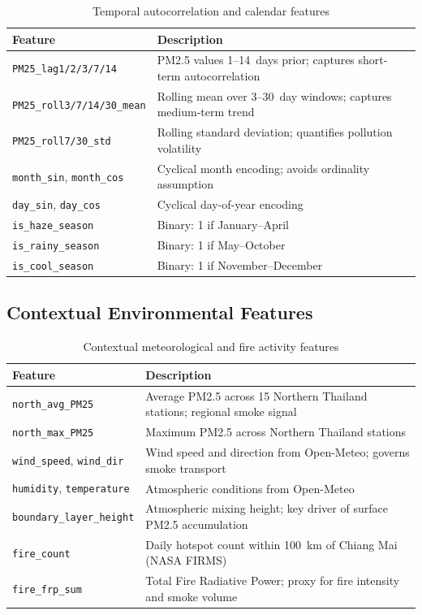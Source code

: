 \documentclass[12pt,a4paper]{report}
\begin{document}
\begin{table}[H]
\centering
\caption{Temporal autocorrelation and calendar features}
\label{tab:temporal_features}
\begin{tabularx}{\textwidth}{@{}lX@{}}
\toprule
\textbf{Feature} & \textbf{Description} \\
\midrule
\texttt{PM25\_lag1/2/3/7/14}       & PM2.5 values 1--14~days prior; captures short-term autocorrelation \\
\texttt{PM25\_roll3/7/14/30\_mean} & Rolling mean over 3--30~day windows; captures medium-term trend \\
\texttt{PM25\_roll7/30\_std}       & Rolling standard deviation; quantifies pollution volatility \\
\texttt{month\_sin}, \texttt{month\_cos} & Cyclical month encoding; avoids ordinality assumption \\
\texttt{day\_sin}, \texttt{day\_cos}     & Cyclical day-of-year encoding \\
\texttt{is\_haze\_season}          & Binary: 1 if January--April \\
\texttt{is\_rainy\_season}         & Binary: 1 if May--October \\
\texttt{is\_cool\_season}          & Binary: 1 if November--December \\
\bottomrule
\end{tabularx}
\end{table}

\subsection{Contextual Environmental Features}

\begin{table}[H]
\centering
\caption{Contextual meteorological and fire activity features}
\label{tab:contextual_features}
\begin{tabularx}{\textwidth}{@{}lX@{}}
\toprule
\textbf{Feature} & \textbf{Description} \\
\midrule
\texttt{north\_avg\_PM25}       & Average PM2.5 across 15 Northern Thailand stations; regional smoke signal \\
\texttt{north\_max\_PM25}       & Maximum PM2.5 across Northern Thailand stations \\
\texttt{wind\_speed}, \texttt{wind\_dir} & Wind speed and direction from Open-Meteo; governs smoke transport \\
\texttt{humidity}, \texttt{temperature} & Atmospheric conditions from Open-Meteo \\
\texttt{boundary\_layer\_height}        & Atmospheric mixing height; key driver of surface PM2.5 accumulation \\
\texttt{fire\_count}             & Daily hotspot count within 100~km of Chiang Mai (NASA FIRMS) \\
\texttt{fire\_frp\_sum}          & Total Fire Radiative Power; proxy for fire intensity and smoke volume \\
\bottomrule
\end{tabularx}
\end{table}
\end{document}
